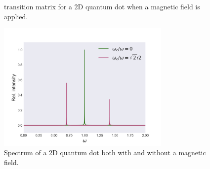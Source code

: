 \begin{figure}
\begin{center}
\begin{minipage}{0.49\textwidth}
        \caption{transition matrix for a 2D quantum dot when a magnetic field
            is applied.}
        \label{fig:transition_yes_b}
    \end{minipage}        
    \end{center}
\end{figure}

\begin{figure}
    \centering
    \includegraphics[width=0.75\textwidth]{results/figures/transmission_spectrum.png}
    \caption{Spectrum of a 2D quantum dot both with and without a magnetic field.}
    \label{fig:transmission_spectrum_b_field}
\end{figure}